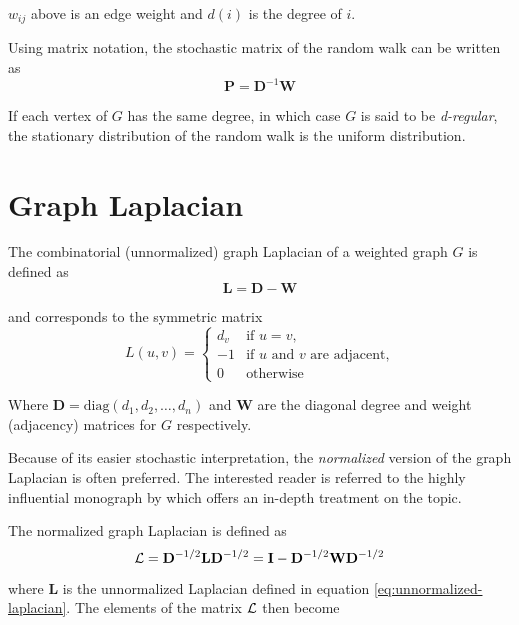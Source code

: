 $w_{ij}$ above is an edge weight and $d(i)$ is the degree of $i$.

Using matrix notation, the stochastic matrix of the random walk can be written as
\begin{equation}
\mathbf{P} = \mathbf{D}^{-1}\mathbf{W}
\label{eq:random-walk}
\end{equation}

If each vertex of $G$ has the same degree, in which case $G$ is said to be \textit{d-regular}, the stationary distribution of the random walk is the uniform distribution. 

\section{Graph Laplacian}
\label{sec:laplacian}

The combinatorial (unnormalized) graph Laplacian of a weighted graph $G$ is defined
as
\begin{equation}
\mathbf{L} = \mathbf{D} - \mathbf{W}
\label{eq:unnormalized-laplacian}
\end{equation}

and corresponds to the symmetric matrix
\begin{equation}
L(u,v) = 
\begin{cases}
d_v & \mbox{if $u = v$,} \\
-1 & \text{if $u$ and $v$ are adjacent,} \\
0 & \text{otherwise}
\end{cases}
\end{equation}

Where $\mathbf{D} = \text{diag}(d_1, d_2, \dots, d_n)$ and $\mathbf{W}$ are the
diagonal degree and weight (adjacency) matrices for $G$ respectively.

Because of its easier stochastic interpretation, the \textit{normalized} version of the graph Laplacian is often preferred. The interested reader is referred to the highly influential monograph by \cite{Chung1997} which offers an in-depth treatment on the topic.

The normalized graph Laplacian is defined as
\begin{equation}
\mathbf{\mathcal{L}} = \mathbf{D}^{-1/2} \mathbf{L} \mathbf{D}^{-1/2} = \mathbf{I} -
\mathbf{D}^{-1/2} \mathbf{W} \mathbf{D}^{-1/2}
\label{eq:normalized-laplacian}
\end{equation}	

where $\mathbf{L}$ is the unnormalized Laplacian defined in equation
\ref{eq:unnormalized-laplacian}.  The elements of the matrix $\mathbf{\mathcal{L}}$ then become

